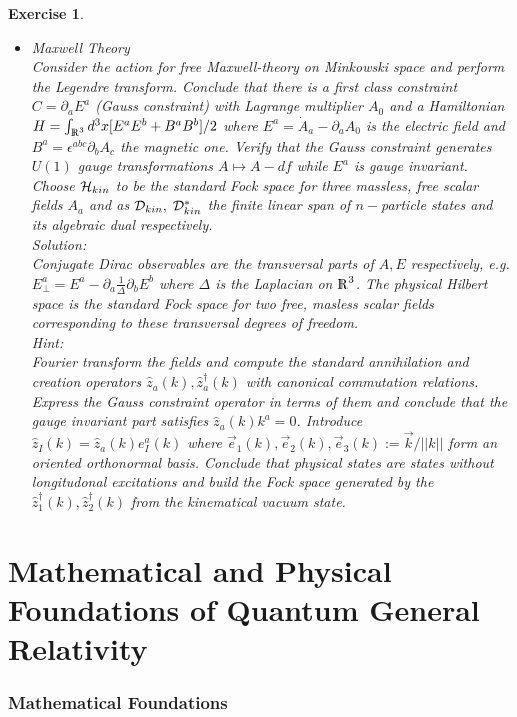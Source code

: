 \documentclass[12pt]{report}
\newtheorem{Exercise}{Exercise}[section]
\def\Rl{{\mathchoice
{\setbox0=\hbox{$\displaystyle\rm R$}\hbox{\hbox to0pt
{\kern0.4\wd0\vrule height0.9\ht0\hss}\box0}}
{\setbox0=\hbox{$\textstyle\rm R$}\hbox{\hbox to0pt
{\kern0.4\wd0\vrule height0.9\ht0\hss}\box0}}
{\setbox0=\hbox{$\scriptstyle\rm R$}\hbox{\hbox to0pt
{\kern0.4\wd0\vrule height0.9\ht0\hss}\box0}}
{\setbox0=\hbox{$\scriptscriptstyle\rm R$}\hbox{\hbox to0pt
{\kern0.4\wd0\vrule height0.9\ht0\hss}\box0}}}}
\begin{document}
\begin{Exercise}
\begin{itemize}
This example has features rather close to those of general 
relativity.
%
\item[4.] {\it Maxwell Theory}\\
Consider the action for free Maxwell-theory on Minkowski space and 
perform the Legendre transform. Conclude that there is a first 
class constraint $C=\partial_a E^a$ (Gauss constraint) with
Lagrange multiplier $A_0$ and a Hamiltonian 
$H=\int_{\Rl^3} d^3x [E^a E^b+B^a B^b]/2$ where 
$E^a=\dot{A}_a-\partial_a A_0$ is the electric 
field and $B^a=\epsilon^{abc} \partial_b A_c$ the magnetic one.
Verify that the Gauss constraint generates $U(1)$ gauge transformations 
$A\mapsto A-df$ while $E^a$ is gauge invariant. Choose ${\cal H}_{kin}$
to be the standard Fock space for three massless, free scalar fields 
$A_a$ and as ${\cal D}_{kin},\;{\cal D}_{kin}^\ast$ the finite linear span 
of $n-$particle states and its algebraic dual respectively.
\\
Solution:\\
Conjugate Dirac observables are the transversal parts of $A,E$ 
respectively, e.g.
$E_\perp^a=E^a-\partial_a\frac{1}{\Delta} \partial_b E^b$ 
where $\Delta$ is the Laplacian on $\Rl^3$. The physical Hilbert 
space is the standard Fock space for two free, masless scalar fields
corresponding to these transversal degrees of freedom.\\
Hint:\\
Fourier transform the fields and compute the standard annihilation and 
creation operators $\hat{z}_a(k),\hat{z}_a^\dagger(k)$ with canonical 
commutation relations. Express the Gauss constraint operator in terms 
of them and conclude that the gauge invariant part satisfies 
$\hat{z}_a(k) k^a=0$. Introduce $\hat{z}_I(k)=\hat{z}_a(k) e^a_I(k)$
where $\vec{e}_1(k),\vec{e}_2(k),\vec{e}_3(k):=\vec{k}/||k||$ form an 
oriented 
orthonormal basis. Conclude that physical states are states without 
longitudonal excitations and build the Fock space 
generated by the $\hat{z}^\dagger_1(k),\hat{z}^\dagger_2(k)$ from 
the kinematical vacuum state.
%
\end{itemize}
\end{Exercise}


\part{ Mathematical and Physical Foundations of Quantum 
General Relativity} 
\label{s2}


\section{Mathematical Foundations}
\label{s2.1}
\end{document}
